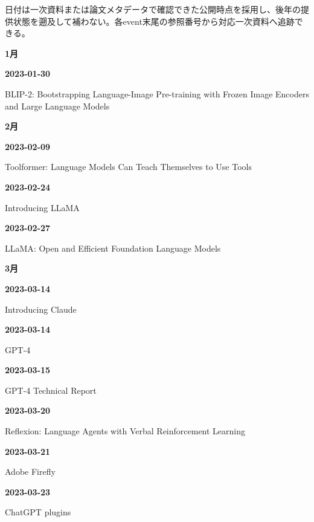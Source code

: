 \noindent 日付は一次資料または論文メタデータで確認できた公開時点を採用し、後年の提供状態を遡及して補わない。各event末尾の参照番号から対応一次資料へ追跡できる。
\par\medskip
\medskip
\noindent\textbf{1月}\par
\smallskip
\noindent\textbf{2023-01-30}\par
{\raggedright BLIP-2: Bootstrapping Language-Image Pre-training with Frozen Image Encoders and Large Language Models\,\cite{chron-7d3c4718241c}\par}
\smallskip
\medskip
\noindent\textbf{2月}\par
\smallskip
\noindent\textbf{2023-02-09}\par
{\raggedright Toolformer: Language Models Can Teach Themselves to Use Tools\,\cite{src-150e07b331df}\par}
\smallskip
\noindent\textbf{2023-02-24}\par
{\raggedright Introducing LLaMA\,\cite{src-3db09fede330}\par}
\smallskip
\noindent\textbf{2023-02-27}\par
{\raggedright LLaMA: Open and Efficient Foundation Language Models\,\cite{src-8bdb904686fb}\par}
\smallskip
\medskip
\noindent\textbf{3月}\par
\smallskip
\noindent\textbf{2023-03-14}\par
{\raggedright Introducing Claude\,\cite{src-f5041642fb21}\par}
\smallskip
\noindent\textbf{2023-03-14}\par
{\raggedright GPT-4\,\cite{src-3375c5d27d9b}\par}
\smallskip
\noindent\textbf{2023-03-15}\par
{\raggedright GPT-4 Technical Report\,\cite{src-5bfa9c93d034}\par}
\smallskip
\noindent\textbf{2023-03-20}\par
{\raggedright Reflexion: Language Agents with Verbal Reinforcement Learning\,\cite{chron-0a76d7a5882f}\par}
\smallskip
\noindent\textbf{2023-03-21}\par
{\raggedright Adobe Firefly\,\cite{src-2b694ab9a461}\par}
\smallskip
\noindent\textbf{2023-03-23}\par
{\raggedright ChatGPT plugins\,\cite{src-97786632d087}\par}
